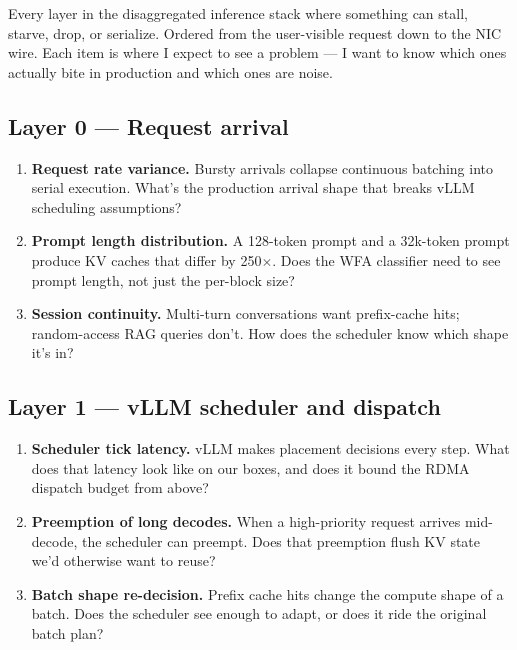 \documentclass[11pt]{article}
\begin{document}
Every layer in the disaggregated inference stack where something can
stall, starve, drop, or serialize. Ordered from the user-visible
request down to the NIC wire. Each item is where I expect to see a
problem --- I want to know which ones actually bite in production
and which ones are noise.

\subsection*{Layer 0 --- Request arrival}
\begin{enumerate}
\item \textbf{Request rate variance.} Bursty arrivals collapse
continuous batching into serial execution. What's the production
arrival shape that breaks vLLM scheduling assumptions?
\item \textbf{Prompt length distribution.} A 128-token prompt and a
32k-token prompt produce KV caches that differ by 250$\times$. Does
the WFA classifier need to see prompt length, not just the per-block
size?
\item \textbf{Session continuity.} Multi-turn conversations want
prefix-cache hits; random-access RAG queries don't. How does the
scheduler know which shape it's in?
\end{enumerate}

\subsection*{Layer 1 --- vLLM scheduler and dispatch}
\begin{enumerate}[resume]
\item \textbf{Scheduler tick latency.} vLLM makes placement decisions
every step. What does that latency look like on our boxes, and does
it bound the RDMA dispatch budget from above?
\item \textbf{Preemption of long decodes.} When a high-priority
request arrives mid-decode, the scheduler can preempt. Does that
preemption flush KV state we'd otherwise want to reuse?
\item \textbf{Batch shape re-decision.} Prefix cache hits change the
compute shape of a batch. Does the scheduler see enough to adapt, or
does it ride the original batch plan?
\end{enumerate}
\end{document}

